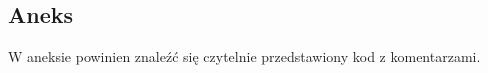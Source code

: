 \documentclass[12pt]{article}
\begin{document}
\newpage


\printbibliography[title ={BIBLIOGRAFIA}]

\newpage

\listoftables
{}

\listoffigures
{}

\newpage

\subsection*{Aneks}
W aneksie powinien znaleźć się czytelnie przedstawiony kod z komentarzami.


\newpage
\end{document}
